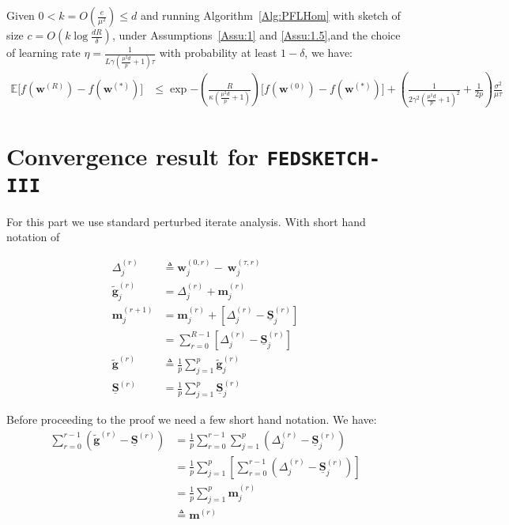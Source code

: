 \begin{theorem}
Given $0<k=O\left(\frac{e}{\mu^2}\right)\leq d$
and running Algorithm~\ref{Alg:PFLHom} with sketch of size $c=O\left(k\log \frac{d R}{\delta}\right)$,  under Assumptions~\ref{Assu:1} and \ref{Assu:1.5},and the choice of learning rate $\eta=\frac{1}{L\gamma (\frac{\mu^2d}{p}+1) \tau}$ with probability at least $1-\delta$, we have:
\begin{align}
                \mathbb{E}\Big[f({\boldsymbol{w}}^{(R)})-f({\boldsymbol{w}}^{(*)})\Big]&\leq \exp{-\left(\frac{ R}{\kappa (\frac{\mu^2d}{p}+1)}\right)}\Big[f({\boldsymbol{w}}^{(0)})-f({\boldsymbol{w}}^{(*)})\Big]+\left(\frac{1}{2\gamma^2 {(\frac{\mu^2d}{p}+1)}^2 }+\frac{1}{2p}\right)\frac{\sigma^2}{\mu\tau}
\end{align}
\end{theorem}



\section{Convergence result for \texttt{FEDSKETCH-III}}
For this part we use standard perturbed iterate analysis. With short hand notation of 

\begin{align}
\Delta_j^{(r)}&\triangleq\boldsymbol{w}_j^{(0,r)}-~{\boldsymbol{w}}_{j}^{(\tau,r)}\nonumber\\
\tilde{\mathbf{g}}^{(r)}_j&=\Delta_j^{(r)}+\mathbf{m}_j^{(r)}\nonumber\\
\mathbf{m}_j^{(r+1)}&=\mathbf{m}_j^{(r)}+\left[\Delta_j^{(r)}-\underline{\mathbf{S}}_j^{(r)}\right]\nonumber\\
&=\sum_{r=0}^{R-1}\left[\Delta_j^{(r)}-\underline{\mathbf{S}}_j^{(r)}\right]\nonumber\\
\tilde{\mathbf{g}}^{(r)}&\triangleq\frac{1}{p}\sum_{j=1}^p\tilde{\mathbf{g}}_j^{(r)}\nonumber\\
\underline{\mathbf{S}}^{(r)}&=\frac{1}{p}\sum_{j=1}^p\underline{\mathbf{S}}^{(r)}_j
\end{align}


Before proceeding to the proof we need a few short hand notation. We have:
\begin{align}
     \sum_{r=0}^{r-1}\left(\tilde{\mathbf{g}}^{(r)}-\underline{\mathbf{S}}^{(r)}\right)&{=} \frac{1}{p}\sum_{r=0}^{r-1}\sum_{j=1}^p\left(\Delta_j^{(r)}-\underline{\mathbf{S}}^{(r)}_j\right)\nonumber\\
    &= \frac{1}{p}\sum_{j=1}^p\left[\sum_{r=0}^{r-1}\left(\Delta_j^{(r)}-\underline{\mathbf{S}}^{(r)}_j\right)\right]\nonumber\\
    &= \frac{1}{p}\sum_{j=1}^p\mathbf{m}_j^{(r)}\nonumber\\
    &\triangleq\mathbf{m}^{(r)}
\end{align}

